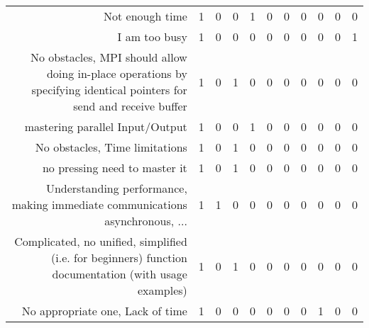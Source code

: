{\begin{landscape}
\begin{longtable}[htb]{r|c|c|c|c|c|c|c|c|c|c}
{Not enough time} & 1 & 0 & 0 & 1 & 0 & 0 & 0 & 0 & 0 & 0 \\%
{I am too busy} & 1 & 0 & 0 & 0 & 0 & 0 & 0 & 0 & 0 & 1 \\%
{No obstacles, MPI should allow doing in-place operations by specifying identical pointers for send and receive buffer} & 1 & 0 & 1 & 0 & 0 & 0 & 0 & 0 & 0 & 0 \\%
{mastering parallel Input/Output} & 1 & 0 & 0 & 1 & 0 & 0 & 0 & 0 & 0 & 0 \\%
{No obstacles, Time limitations} & 1 & 0 & 1 & 0 & 0 & 0 & 0 & 0 & 0 & 0 \\%
{no pressing need to master it} & 1 & 0 & 1 & 0 & 0 & 0 & 0 & 0 & 0 & 0 \\%
{Understanding performance, making immediate communications asynchronous, ...} & 1 & 1 & 0 & 0 & 0 & 0 & 0 & 0 & 0 & 0 \\%
{Complicated, no unified, simplified (i.e. for beginners) function documentation (with usage examples)} & 1 & 0 & 1 & 0 & 0 & 0 & 0 & 0 & 0 & 0 \\%
{No appropriate one, Lack of time} & 1 & 0 & 0 & 0 & 0 & 0 & 0 & 1 & 0 & 0 \\%
\hline%
\end{longtable}%
\end{landscape}}%
\clearpage%
